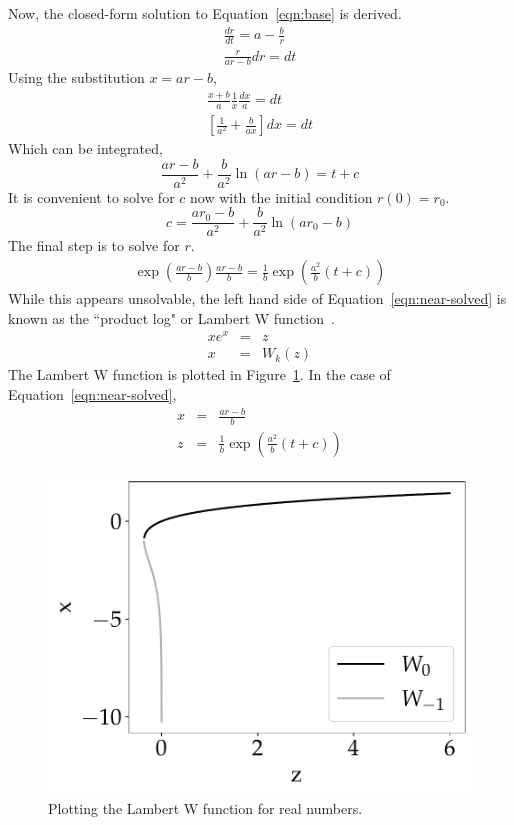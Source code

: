 \documentclass[journal]{IEEEtran}
\begin{document}
Now, the closed-form solution to Equation~\ref{eqn:base} is derived.
\begin{eqnarray}
  \frac{dr}{dt} = a - \frac{b}{r} \\
  \frac{r}{ar - b} dr = dt
\end{eqnarray}
Using the substitution $x = ar-b$,
\begin{eqnarray}
  \frac{x+b}{a}\frac{1}{x} \frac{dx}{a} = dt \\
  \left[\frac{1}{a^2} + \frac{b}{ax}\right] dx = dt
\end{eqnarray}
Which can be integrated,
\begin{equation}
  \frac{ar-b}{a^2} + \frac{b}{a^2}\ln\left(ar-b\right) = t + c
\end{equation}
It is convenient to solve for $c$ now with the initial condition $r(0) = r_0$.
\begin{equation}
  c = \frac{ar_0-b}{a^2} + \frac{b}{a^2}\ln\left(ar_0 - b\right)
\end{equation}
The final step is to solve for $r$.
\begin{eqnarray}
  \label{eqn:near-solved}
  \exp\left( \frac{ar-b}{b}\right) \frac{ar-b}{b} = \frac{1}{b}\exp\left(\frac{a^2}{b}(t+c)\right)
\end{eqnarray}
While this appears unsolvable, the left hand side of Equation~\ref{eqn:near-solved} is known as the ``product log" or Lambert W function~\cite{lambert1758observationes,weisstein2002lambert}.
\begin{eqnarray}
  xe^x &=& z \\
  x &=& W_k(z)
\end{eqnarray}
The Lambert W function is plotted in Figure~\ref{fig:w}.
In the case of Equation~\ref{eqn:near-solved},
\begin{eqnarray}
  \label{eqn:x}
  x &=& \frac{ar-b}{b} \\
  z &=& \frac{1}{b} \exp\left(\frac{a^2}{b}(t+c)\right)
\end{eqnarray}

\begin{figure}[b]
  \centering
    \includegraphics[width=0.9\linewidth]{w}%
  \caption{Plotting the Lambert W function for real numbers.}
  \label{fig:w}
\end{figure}
\end{document}
